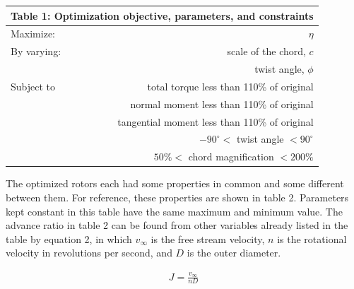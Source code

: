 \documentclass[journal ]{new-aiaa}
\begin{document}
\begin{center}
\begin{tabular}{l  r}
	 \multicolumn{2}{c}{Table 1: Optimization objective, parameters, and constraints}  \\ \hline
  	Maximize: & $\eta$ \\ \hline
  	By varying: & scale of the chord, $c$ \\ 
  	 & twist angle, $\phi$ \\  \hline
  	Subject to & total torque less than 110\% of original \\ 
	 & normal moment less than 110\% of original \\ 
	 & tangential moment less than 110\% of original \\ 
	 & $-90^{\circ} <$ twist angle $< 90^{\circ}$ \\
	 & $50\% <$ chord magnification $< 200\% $ \\ \hline
\end{tabular}
\end{center}

The optimized rotors each had some properties in common and some different between them. For reference, these properties are shown in table 2. Parameters kept constant in this table have the same maximum and minimum value. The advance ratio in table 2 can be found from other variables already listed in the table by equation 2, in which $v_{\infty}$ is the free stream velocity, $n$ is the rotational velocity in revolutions per second, and $D$ is the outer diameter.

\begin{equation}
	\begin{aligned}
	\label{equation:2}
	J = \frac{v_{\infty}}{n D}
	\end{aligned}
\end{equation}
\end{document}
